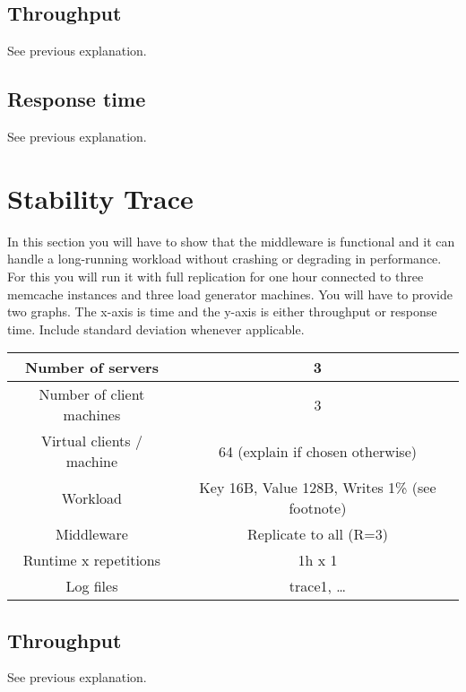 \documentclass[11pt]{article}
\begin{document}




\subsection{Throughput}\label{sec:baseline:tput}
See previous explanation.
\subsection{Response time}\label{sec:baseline:rt}
See previous explanation.

\section{Stability Trace}\label{sec:trace}

In this section you will have to show that the middleware is functional and it can handle a long-running workload without crashing or degrading in performance. For this you will run it with full replication for one hour connected to three memcache instances and three load generator machines.
You will have to provide two graphs. The x-axis is time and the y-axis is either throughput or response time. Include standard deviation whenever applicable. 

\small{
\smallskip
\begin{tabular}{|c|c|}
\hline Number of servers & 3 \\ 
\hline Number of client machines & 3 \\ 
\hline Virtual clients / machine &  64 (explain if chosen otherwise) \\ 
\hline Workload & Key 16B, Value 128B, Writes 1\% (see footnote) \\
\hline Middleware & Replicate to all (R=3) \\ 
\hline Runtime x repetitions & 1h x 1 \\ 
\hline Log files & trace1, \ldots \\
\hline 
\end{tabular} }



\subsection{Throughput}
See previous explanation.
\end{document}
